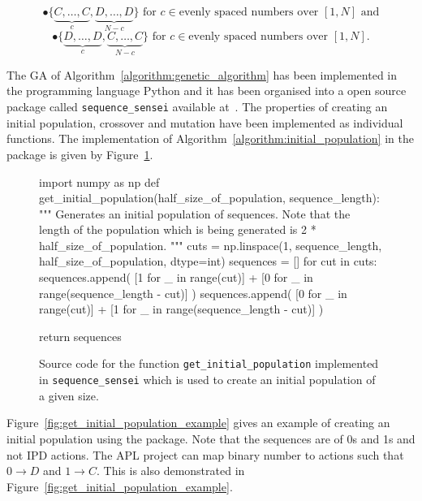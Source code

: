 \[\bullet \{\underbrace{C, \dots, C}_{c}, \underbrace{D, \dots, D}_{N-c}\} \text{ for } c \in \text{evenly spaced numbers over } [1, N] \text{ and}\]
\[\bullet \{\underbrace{D, \dots, D}_{c}, \underbrace{C, \dots, C}_{N-c}\} \text{ for } c \in \text{evenly spaced numbers over } [1, N].\]

The GA of Algorithm~\ref{algorithm:genetic_algorithm} has been implemented in the programming language Python
and it has been organised into a open source package called
\texttt{sequence_sensei} available at~\cite{Glynatsi_2020_sensei}.
The properties of creating an initial population, crossover and mutation have been
implemented as individual functions.
The implementation of Algorithm~\ref{algorithm:initial_population} in the package
is given by Figure~\ref{fig:get_initial_population}.

\begin{figure}[!htbp]
\begin{sourcepy}
import numpy as np
def get_initial_population(half_size_of_population, sequence_length):
    """
    Generates an initial population of sequences. Note that the length
    of the population which is being generated is 2 * half_size_of_population.
    """
    cuts = np.linspace(1, sequence_length, half_size_of_population, dtype=int)
    sequences = []
    for cut in cuts:
        sequences.append(
            [1 for _ in range(cut)] + [0 for _ in range(sequence_length - cut)]
        )
        sequences.append(
            [0 for _ in range(cut)] + [1 for _ in range(sequence_length - cut)]
        )

    return sequences
\end{sourcepy}
\caption{Source code for the function \texttt{get_initial_population}
implemented in \texttt{sequence_sensei} which is used to create an
initial population of a given size.}\label{fig:get_initial_population}
\end{figure}

Figure~\ref{fig:get_initial_population_example} gives an example of creating an
initial population using the package. Note that the sequences are of 0s and 1s
and not IPD actions. The APL project can map binary number to actions such that
\(0 \to D\) and \(1 \to C\). This is also demonstrated in
Figure~\ref{fig:get_initial_population_example}.

